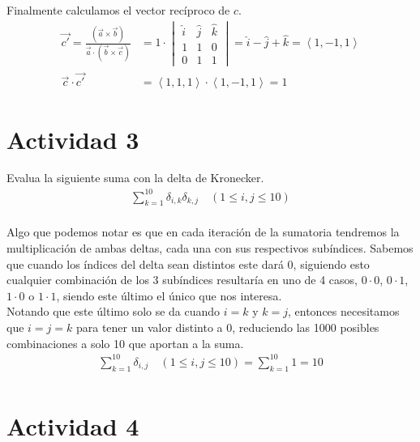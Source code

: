 \documentclass{article}
\newcommand{\custvec}[1]{\left\langle#1\right\rangle}
\begin{document}
Finalmente calculamos el vector recíproco de $c$.
\begin{equation*}
    \begin{split}
        \vec{c'} = \frac{(\vec{a}\times \vec{b})}{\vec{a}\cdot (\vec{b}\times \vec{c})} &= 1\cdot \begin{vmatrix}
        \hat{i} & \hat{j} & \hat{k} \\
        1 & 1 & 0 \\
        0 & 1 & 1
        \end{vmatrix} = \hat{i} - \hat{j} + \hat{k} = \custvec{1,-1,1}\\
        \vec{c}\cdot \vec{c'} &= \custvec{1,1,1}\cdot \custvec{1,-1,1} = 1 
    \end{split}
\end{equation*}
\newpage
\section{Actividad 3}
Evalua la siguiente suma con la delta de Kronecker.\\
\begin{equation*}
    \begin{split}
       \sum\limits_{k=1}^{10} \delta_{i,k}\delta_{k,j}\quad(1\leq i,j \leq 10)\\
    \end{split}
\end{equation*}

Algo que podemos notar es que en cada iteración de la sumatoria tendremos la multiplicación de ambas deltas, cada una con sus respectivos subíndices. Sabemos que cuando los índices del delta sean distintos este dará 0, siguiendo esto cualquier combinación de los 3 subíndices resultaría en uno de 4 casos, $0\cdot 0$, $0\cdot 1$, $1\cdot 0$ o $1\cdot1$, siendo este último el único que nos interesa.\\

Notando que este último solo se da cuando $i=k$ y $k=j$, entonces necesitamos que $i=j=k$ para tener un valor distinto a 0, reduciendo las 1000 posibles combinaciones a solo 10 que aportan a la suma.\\
\begin{equation*}
    \begin{split}
       \sum\limits_{k=1}^{10}\delta_{i,j}\quad (1\leq i,j \leq 10) = \sum\limits_{k=1}^{10}1 = 10\\
    \end{split}
\end{equation*}
\newpage
\section{Actividad 4}
\end{document}
